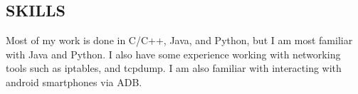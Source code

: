\documentclass[zhemargin]{res}
\begin{document}
\begin{resume}
\section{\small SKILLS}
	Most of my work is done in C/C++, Java, and Python, but I am most familiar 
  with Java and Python. I also have some experience working with networking 
  tools such as iptables, and tcpdump. I am also familiar with interacting 
  with android smartphones via ADB.

\end{resume}
\end{document}
